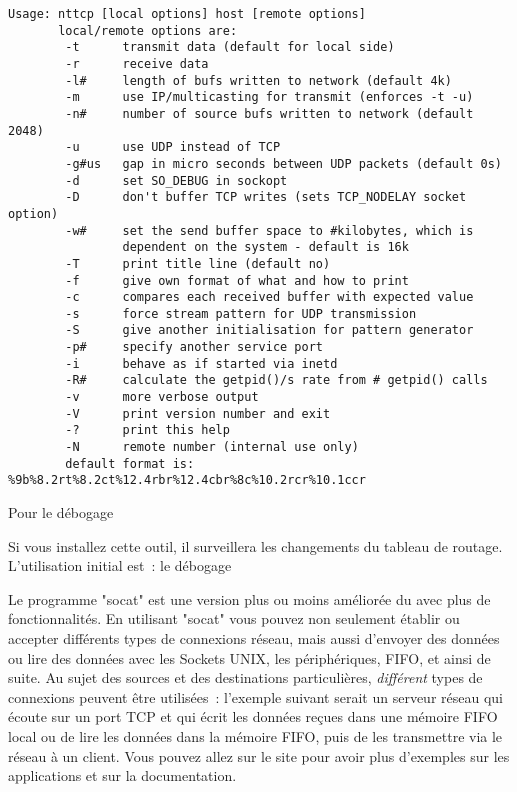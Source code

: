 \begin{description}
\begin{verbatim}
Usage: nttcp [local options] host [remote options]
       local/remote options are:
        -t      transmit data (default for local side)
        -r      receive data
        -l#     length of bufs written to network (default 4k)
        -m      use IP/multicasting for transmit (enforces -t -u)
        -n#     number of source bufs written to network (default 2048)
        -u      use UDP instead of TCP
        -g#us   gap in micro seconds between UDP packets (default 0s)
        -d      set SO_DEBUG in sockopt
        -D      don't buffer TCP writes (sets TCP_NODELAY socket option)
        -w#     set the send buffer space to #kilobytes, which is
                dependent on the system - default is 16k
        -T      print title line (default no)
        -f      give own format of what and how to print
        -c      compares each received buffer with expected value
        -s      force stream pattern for UDP transmission
        -S      give another initialisation for pattern generator
        -p#     specify another service port
        -i      behave as if started via inetd
        -R#     calculate the getpid()/s rate from # getpid() calls
        -v      more verbose output
        -V      print version number and exit
        -?      print this help
        -N      remote number (internal use only)
        default format is: %9b%8.2rt%8.2ct%12.4rbr%12.4cbr%8c%10.2rcr%10.1ccr
\end{verbatim}

 Pour le débogage

    Si vous installez cette outil, il surveillera les changements du tableau
    de routage. L'utilisation initial est~: le débogage


    Le programme "socat" est une version plus ou moins améliorée du
     avec plus de fonctionnalités.
    En utilisant "socat" vous pouvez non seulement établir ou accepter
    différents types de connexions réseau, mais aussi d'envoyer des données
    ou lire des données avec les Sockets UNIX, les périphériques, FIFO, et
    ainsi de suite. Au sujet des sources et des destinations particulières,
    \emph{différent} types de connexions peuvent être utilisées~: l'exemple
    suivant serait un serveur réseau qui écoute sur un port TCP et qui écrit
    les données reçues dans une mémoire FIFO local ou de lire les données dans
    la mémoire FIFO, puis de les transmettre via le réseau à un client. Vous
    pouvez allez sur le site 
    pour avoir plus d'exemples sur les applications et sur la documentation.


\end{description}
